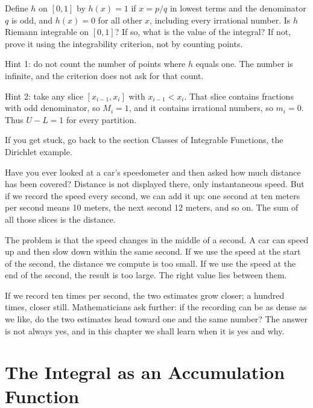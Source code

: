 \begin{tantangan}
Define $h$ on $[0,1]$ by $h(x)=1$ if $x=p/q$ in lowest terms
and the denominator $q$ is odd, and $h(x)=0$ for all other $x$, including every irrational
number. Is $h$ Riemann integrable on $[0,1]$? If so, what is the value of
the integral? If not, prove it using the integrability criterion, not by
counting points.

Hint 1: do not count the number of points where $h$ equals one. The number is
infinite, and the criterion does not ask for that count.

Hint 2: take any slice $[x_{i-1},x_i]$ with $x_{i-1}<x_i$. That slice
contains fractions with odd denominator, so $M_i=1$, and it contains irrational numbers, so
$m_i=0$. Thus $U-L=1$ for every partition.

If you get stuck, go back to the section Classes of Integrable Functions, the Dirichlet example.
\end{tantangan}


\begin{untukanak}
Have you ever looked at a car's speedometer and then asked how much distance has been
covered? Distance is not displayed there, only instantaneous speed. But if we
record the speed every second, we can add it up: one second at
ten meters per second means 10 meters, the next second 12 meters, and
so on. The sum of all those slices is the distance.

The problem is that the speed changes in the middle of a second. A car can speed up and then slow down
within the same second. If we use the speed at the start of the second, the distance we
compute is too small. If we use the speed at the end of the second, the result is too
large. The right value lies between them.

If we record ten times per second, the two estimates grow closer; a hundred times,
closer still. Mathematicians ask further: if the recording can be as dense as we
like, do the two estimates head toward one and the same number? The answer is not always yes,
and in this chapter we shall learn when it is yes and why.
\end{untukanak}

\section{The Integral as an Accumulation Function}


